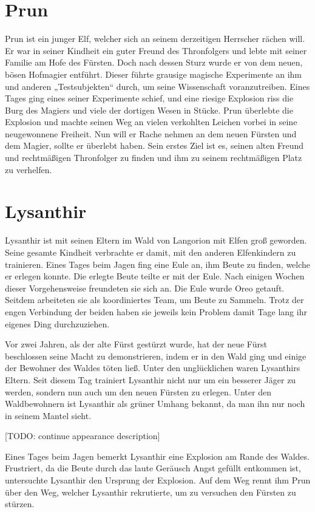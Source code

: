 \documentclass[10pt,twoside,twocolumn,openany]{book}
\begin{document}
	\section{Prun}
	Prun ist ein junger Elf, welcher sich an seinem derzeitigen Herrscher rächen will. Er war in seiner Kindheit ein guter Freund des Thronfolgers und lebte mit seiner Familie am Hofe des Fürsten. Doch nach dessen Sturz wurde er von dem neuen, bösen Hofmagier entführt. Dieser führte grausige magische Experimente an ihm und anderen „Testsubjekten“ durch, um seine Wissenschaft voranzutreiben. Eines Tages ging eines seiner Experimente schief, und eine riesige Explosion riss die Burg des Magiers und viele der dortigen Wesen in Stücke. Prun überlebte die Explosion und machte seinen Weg an vielen verkohlten Leichen vorbei in seine neugewonnene Freiheit. Nun will er Rache nehmen an dem neuen Fürsten und dem Magier, sollte er überlebt haben. Sein erstes Ziel ist es, seinen alten Freund und rechtmäßigen Thronfolger zu finden und ihm zu seinem rechtmäßigen Platz zu verhelfen.
	
	\newpage
	\section{Lysanthir}
	
	Lysanthir ist mit seinen Eltern im Wald von Langorion mit Elfen groß geworden. Seine gesamte Kindheit verbrachte er damit, mit den anderen Elfenkindern zu trainieren. Eines Tages beim Jagen fing eine Eule an, ihm Beute zu finden, welche er erlegen konnte. Die erlegte Beute teilte er mit der Eule. Nach einigen Wochen dieser Vorgehensweise freundeten sie sich an. Die Eule wurde Oreo getauft. Seitdem arbeiteten sie als koordiniertes Team, um Beute zu Sammeln. Trotz der engen Verbindung der beiden haben sie jeweils kein Problem damit Tage lang ihr eigenes Ding durchzuziehen. 
	
	Vor zwei Jahren, als der alte Fürst gestürzt wurde, hat der neue Fürst beschlossen seine Macht zu demonstrieren, indem er in den Wald ging und einige der Bewohner des Waldes töten ließ. Unter den unglücklichen waren Lysanthirs Eltern. Seit diesem Tag trainiert Lysanthir nicht nur um ein besserer Jäger zu werden, sondern nun auch um den neuen Fürsten zu erlegen. Unter den Waldbewohnern ist Lysanthir als grüner Umhang bekannt, da man ihn nur noch in seinem Mantel sieht. 
	
	[TODO: continue appearance description]

	Eines Tages beim Jagen bemerkt Lysanthir eine Explosion am Rande des Waldes. Frustriert, da die Beute durch das laute Geräusch Angst gefüllt entkommen ist, untersuchte Lysanthir den Ursprung der Explosion. Auf dem Weg rennt ihm Prun über den Weg, welcher Lysanthir rekrutierte, um zu versuchen den Fürsten zu stürzen.
	
\end{document}
